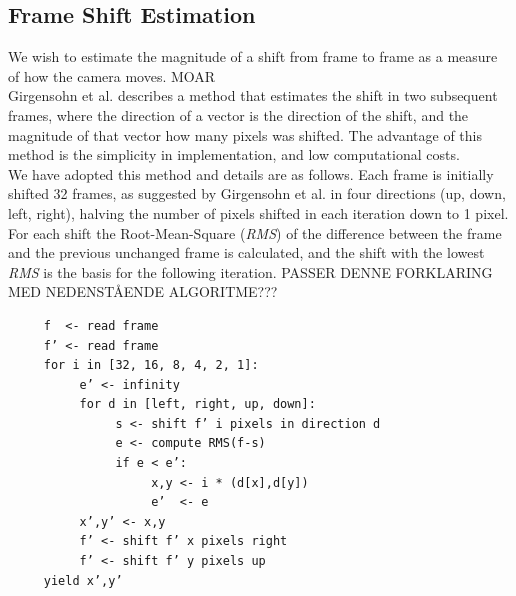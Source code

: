 \subsection{Frame Shift Estimation}
%
We wish to estimate the magnitude of a shift from frame to frame as a measure of how the camera moves. MOAR\\
Girgensohn et al.\cite{Girgensohn:2000:SAH:354401.354415} describes a method that estimates the shift in two subsequent frames, where the direction of a vector is the direction of the shift, and the magnitude of that vector how many pixels was shifted. The advantage of this method is the simplicity in implementation, and low computational costs.\\
We have adopted this method and details are as follows. Each frame is initially shifted 32 frames, as suggested by Girgensohn et al. in four directions (up, down, left, right), halving the number of pixels shifted in each iteration down to 1 pixel.
For each shift the Root-Mean-Square (\textit{RMS}) of the difference between the frame and the previous unchanged frame is calculated, and the shift with the lowest \textit{RMS} is the basis for the following iteration. %
PASSER DENNE FORKLARING MED NEDENSTÅENDE ALGORITME???
%
\begin{verbatim}
     f  <- read frame
     f’ <- read frame
     for i in [32, 16, 8, 4, 2, 1]:
          e’ <- infinity
          for d in [left, right, up, down]:
               s <- shift f’ i pixels in direction d
               e <- compute RMS(f-s)
               if e < e’:
                    x,y <- i * (d[x],d[y])
                    e’  <- e
          x’,y’ <- x,y
          f’ <- shift f’ x pixels right
          f’ <- shift f’ y pixels up
     yield x’,y’
\end{verbatim}
